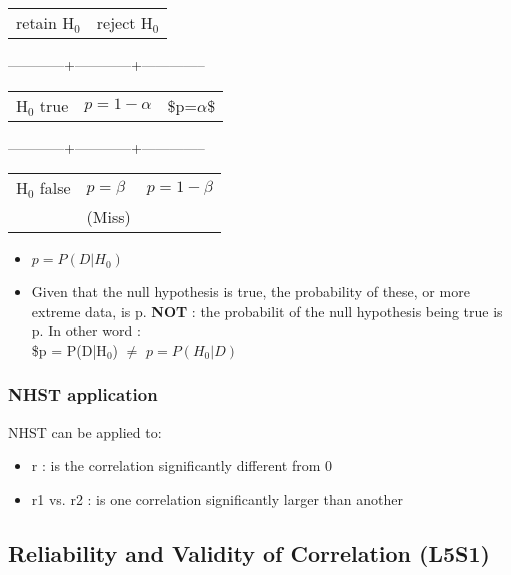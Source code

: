 \documentclass[11pt]{article}
\begin{document}
\begin{center}
\begin{tabular}{ll}
 retain H$_0$  &  reject H$_0$  \\
\end{tabular}
\end{center}


------------+------------+--------------

\begin{center}
\begin{tabular}{lll}
 H$_0$ true  &  $p=1-\alpha$  &  \$p=$\alpha$\$  \\
\end{tabular}
\end{center}


------------+------------+--------------

\begin{center}
\begin{tabular}{lll}
 H$_0$ false  &  $p=\beta$  &  $p=1-\beta$  \\
              &  (Miss)     &               \\
\end{tabular}
\end{center}


\begin{itemize}
\item $p = P(D|H_0)$
\item Given that the null hypothesis is true, the probability
      of these, or more extreme data, is p.
      \textbf{NOT} : the probabilit of the null hypothesis being true is p.
      In other word :\\
      \$p = P(D|H$_0$) $\neq$ $p = P(H_0 | D)$
\end{itemize}
  
\subsubsection{NHST application}
\label{sec-2-3-3}

    NHST can be applied to:
\begin{itemize}
\item r : is the correlation significantly different from 0
\item r1 vs. r2 : is one correlation significantly larger than another
\end{itemize}
\subsection{Reliability and Validity of Correlation (L5S1)}
\label{sec-2-4}
\end{document}
